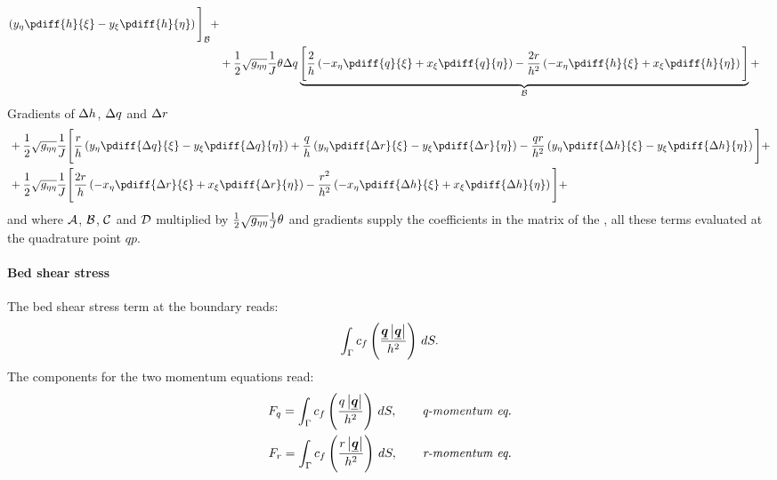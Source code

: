 {\begin{align}
{        \left( y_\eta \pdiff{h}{\xi} - y_\xi \pdiff{h}{\eta}  \right)
        \Bigg]}_{\cal B} +
    \\*
    & + \half \sqrt{g_{\eta\eta}} \Jinv \theta \Dq \underbrace{\Bigg[
    \frac{2}{h} \left( -x_\eta \pdiff{q}{\xi} + x_\xi \pdiff{q}{\eta} \right)
    - \frac{2r}{h^2} \left( -x_\eta \pdiff{h}{\xi} + x_\xi \pdiff{h}{\eta} \right)
    \Bigg]}_{\cal B} +
\end{align}
Gradients of $\Delta h$, $\Delta q$ and $\Delta r$
\begin{align}
    & +  \half \sqrt{g_{\eta\eta}} \Jinv \Bigg[
        \frac{r}{h}
        \left( y_\eta \pdiff{\Dq}{\xi} - y_\xi \pdiff{\Dq}{\eta}  \right)
        + \frac{q}{h}
        \left( y_\eta \pdiff{\Dr}{\xi} - y_\xi \pdiff{\Dr}{\eta}  \right)
        - \frac{qr}{h^2}
        \left( y_\eta \pdiff{\Dh}{\xi} - y_\xi \pdiff{\Dh}{\eta}  \right)
        \Bigg] +
    \\*
    & + \half \sqrt{g_{\eta\eta}} \Jinv \Bigg[
        \frac{2r}{h}
        \left( -x_\eta \pdiff{\Dr}{\xi} + x_\xi \pdiff{\Dr}{\eta}  \right)
        - \frac{r^2}{h^2}
        \left( - x_\eta \pdiff{\Dh}{\xi} + x_\xi \pdiff{\Dh}{\eta}  \right)
        \Bigg] +
\end{align}
}%
%
and where $\cal{A}$, $\cal{B}$, $\cal{C}$ and $\cal{D}$ multiplied by $\frac{1}{2}\sqrt{g_{\eta\eta}} \frac{1}{J} \theta$  and gradients supply the coefficients in the matrix of the \deltaformulation,
all these terms evaluated at the quadrature point $qp$.


\paragraph*{Bed shear stress}
The bed shear stress  term at the boundary  reads:
\begin{align}
    \int_\Gamma c_f \left( \frac{\mbox{\boldmath $\underline{q}$}\left\lvert \mbox{\boldmath $\underline{q}$} \right\rvert}{h^2} \right)\, dS.
\end{align}
The components for the two momentum equations read:
\begin{align}
    F_q = \int_\Gamma c_f \left( \frac{q\left\lvert \mbox{\boldmath $\underline{q}$} \right\rvert}{h^2} \right)\, dS, \qquad \textit{q-momentum eq.}
    \\
    F_r = \int_\Gamma c_f \left( \frac{r\left\lvert \mbox{\boldmath $\underline{q}$} \right\rvert}{h^2} \right)\, dS, \qquad \textit{r-momentum eq.}
\end{align}
